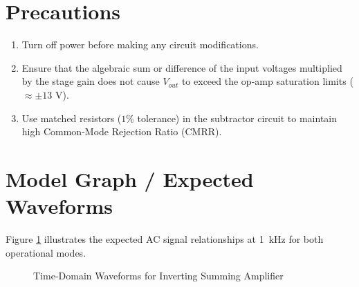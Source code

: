 \section{Precautions}
\begin{enumerate}
	\item Turn off power before making any circuit modifications.
	\item Ensure that the algebraic sum or difference of the input voltages multiplied by the stage gain does not cause $V_{out}$ to exceed the op-amp saturation limits ($\approx \pm 13\text{ V}$).
	\item Use matched resistors ($1\%$ tolerance) in the subtractor circuit to maintain high Common-Mode Rejection Ratio (CMRR).
\end{enumerate}

\section{Model Graph / Expected Waveforms}
Figure \ref{fig:waveforms_adder_sub} illustrates the expected AC signal relationships at \SI{1}{\kilo\hertz} for both operational modes.

\begin{figure}[h!]
	\centering
	\caption{Time-Domain Waveforms for Inverting Summing Amplifier}
	\label{fig:waveforms_adder_sub}
\end{figure}

